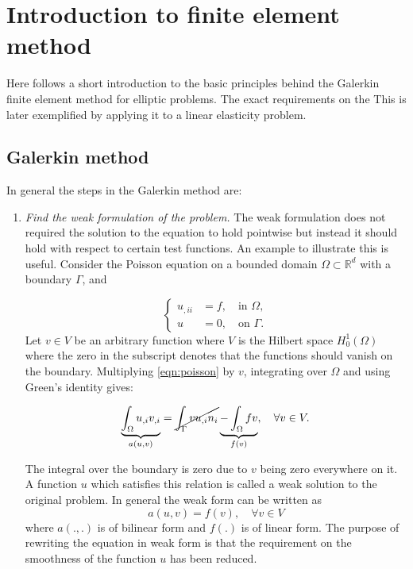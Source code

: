 \documentclass[fem.tex]{subfiles}
\begin{document}
\chapter{Introduction to finite element method}

Here follows a short introduction to the basic principles behind the Galerkin finite element method for elliptic problems. The exact requirements on the This is later exemplified by applying it to a linear elasticity problem.



\section{Galerkin method}
\label{sec:galerkin}

In general the steps in the Galerkin method are:
\begin{enumerate}
\item \emph{Find the weak formulation of the problem.} The weak formulation does not required the solution to the equation to hold pointwise but instead it should hold with respect to certain test functions. An example to illustrate this is useful. Consider the Poisson equation on a bounded domain $\Omega \subset \mathbb{R}^d$ with a boundary $\Gamma$, and


\begin{equation}
\label{eqn:poisson}
\left\{ \begin{array}{ll}
u_{,ii} & = f, \quad \text{in } \Omega, \\
u & = 0, \quad  \text{on } \Gamma. \end{array} \right.
\end{equation}
Let $v \in V$ be an arbitrary function where $V$ is the Hilbert space $H_0^1(\Omega)$ where the zero in the subscript denotes that the functions should vanish on the boundary. Multiplying \ref{eqn:poisson} by $v$, integrating over $\Omega$ and using Green's identity gives:

\begin{align}
\underbrace{\int_\Omega u_{,i} v_{,i}}_{a(u,v)} = \cancel{\int_\Gamma v u_{,i} n_i } \underbrace{- \int_\Omega fv}_{f(v)}, \quad \forall v \in V.
\end{align}

The integral over the boundary is zero due to $v$ being zero everywhere on it. A function $u$ which satisfies this relation is called a weak solution to the original problem. In general the weak form can be written as
\begin{equation}
\label{eqn_weak}
    a(u,v) = f(v), \quad \forall v \in V
\end{equation}
where $a(.,.)$ is of bilinear form and $f(.)$ is of linear form. The purpose of rewriting the equation in weak form is that the requirement on the smoothness of the function $u$ has been reduced. 


\end{enumerate}
\end{document}
